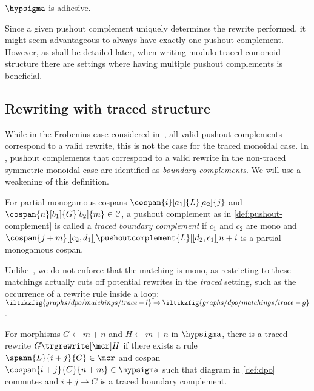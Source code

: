 \begin{proposition}
    \(\hypsigma\) is adhesive.
\end{proposition}

Since a given pushout complement uniquely determines the rewrite performed, it
might seem advantageous to always have exactly one pushout complement.
However, as shall be detailed later, when writing modulo traced comonoid
structure there are settings where having multiple pushout complements is
beneficial.

\subsection{Rewriting with traced structure}

While in the Frobenius case considered in~\cite{bonchi2022string}, all valid
pushout complements correspond to a valid rewrite, this is not the case for the
traced monoidal case.
In \cite{bonchi2022stringa}, pushout complements that correspond to a valid
rewrite in the non-traced symmetric monoidal case are identified as
\emph{boundary complements}.
We will use a weakening of this definition.

\begin{definition}
    \label{def:traced-boundary-complement}
    For partial monogamous cospans \(
        \cospan{i}[a_1]{L}[a_2]{j}
    \) and \(
        \cospan{n}[b_1]{G}[b_2]{m} \in \mathcal{C}
    \), a pushout complement as in \cref{def:pushout-complement} is called a
    \emph{traced boundary complement} if \(c_1\) and \(c_2\) are mono and \(
        \cospan{j+m}[[c_2,d_1]]{\pushoutcomplement{L}}[[d_2,c_1]]{{n+i}}
    \) is a partial monogamous cospan.
\end{definition}

Unlike~\cite{bonchi2022stringa}, we do not enforce that the matching is mono,
as restricting to these matchings actually cuts off potential rewrites in the
\emph{traced} setting, such as the occurrence of a rewrite rule inside a loop: \(
    \iltikzfig{graphs/dpo/matchings/trace-l}
    \to
    \iltikzfig{graphs/dpo/matchings/trace-g}
\).

\begin{definition}
    For morphisms \(G \leftarrow m+n\) and \(H \leftarrow m+n\) in
    \(\hypsigma\), there is a traced rewrite \(G \trgrewrite[\mcr] H\) if there
    exists a rule \(
        \spann{L}{i+j}{G} \in \mcr
    \) and cospan \(
        \cospan{i+j}{C}{n+m} \in \hypsigma
    \) such that diagram in \cref{def:dpo} commutes and \(i+j \to C\) is a
    traced boundary complement.
\end{definition}

